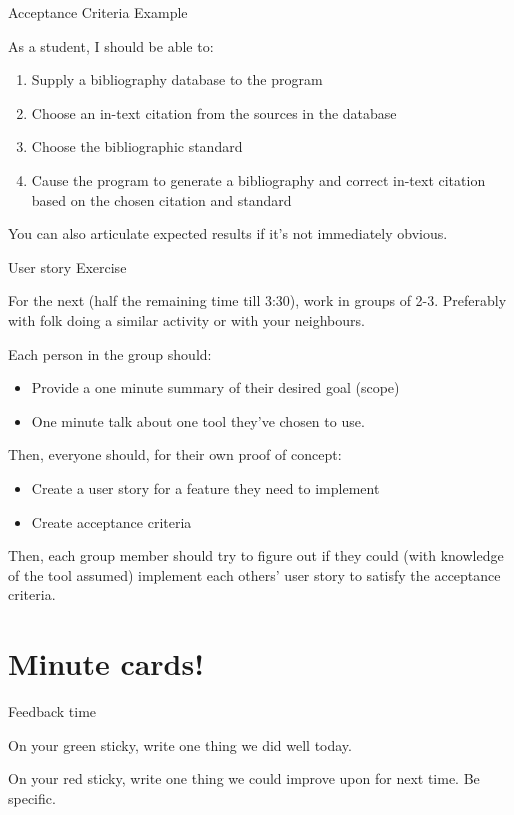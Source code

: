 \documentclass[aspectratio=1610, 11pt]{beamer} %
\begin{document}
\begin{frame}{Acceptance Criteria Example}

As a student, I should be able to: 
\begin{enumerate}[1.]
    \item Supply a bibliography database to the program
    \item Choose an in-text citation from the sources in the database
    \item Choose the bibliographic standard
    \item Cause the program to generate a bibliography and correct in-text citation based on the chosen citation and standard
\end{enumerate}

You can also articulate expected results if it's not immediately obvious. 

\end{frame}
\begin{frame}{User story Exercise}

For the next (half the remaining time till 3:30), work in groups of 2-3. Preferably with folk doing a similar activity or with your neighbours.

Each person in the group should:
\begin{itemize}[\textbullet]
    \item Provide a one minute summary of their desired goal (scope)
    \item One minute talk about one tool they've chosen to use.
\end{itemize}
Then, everyone should, for their own proof of concept:
\begin{itemize}[\textbullet]
    \item Create a user story for a feature they need to implement
    \item Create acceptance criteria
    \end{itemize}

Then, each group member should try to figure out if they could (with knowledge of the tool assumed) implement each others' user story to satisfy the acceptance criteria. 

\end{frame}
\section{Minute cards!}
\begin{frame}{Feedback time}

On your green sticky, write one thing we did well today.

On your red sticky, write one thing we could improve upon for next time. Be specific. 

\end{frame}
\end{document}
